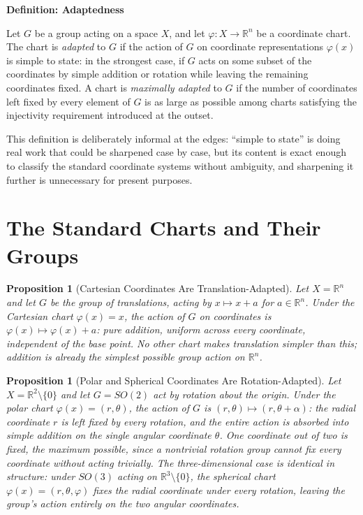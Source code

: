\documentclass[11pt,fleqn]{book}
\numberwithin{equation}{chapter}
\newenvironment{definition}[1]
  {\begin{definitionEnv}
   \noindent\textbf{Definition: #1}\par\smallskip}
  {\end{definitionEnv}}
\theoremstyle{plain}
\newtheorem{proposition}[theorem]{Proposition}
\theoremstyle{definition}
\theoremstyle{remark}
\newcommand{\R}{\mathbb{R}}
\providecommand{\enquote}[1]{``#1''}
\begin{document}
\begin{definition}{Adaptedness}
Let \(G\) be a group acting on a space \(X\), and let \(\varphi:X\to\R^n\) be a coordinate chart. The chart is \emph{adapted} to \(G\) if the action of \(G\) on coordinate representations \(\varphi(x)\) is simple to state: in the strongest case, if \(G\) acts on some subset of the coordinates by simple addition or rotation while leaving the remaining coordinates fixed. A chart is \emph{maximally adapted} to \(G\) if the number of coordinates left fixed by every element of \(G\) is as large as possible among charts satisfying the injectivity requirement introduced at the outset.
\end{definition}

This definition is deliberately informal at the edges: \enquote{simple to state} is doing real work that could be sharpened case by case, but its content is exact enough to classify the standard coordinate systems without ambiguity, and sharpening it further is unnecessary for present purposes.

\section{The Standard Charts and Their Groups}

\begin{proposition}[Cartesian Coordinates Are Translation-Adapted]
Let \(X=\R^n\) and let \(G\) be the group of translations, acting by \(x\mapsto x+a\) for \(a\in\R^n\). Under the Cartesian chart \(\varphi(x)=x\), the action of \(G\) on coordinates is \(\varphi(x)\mapsto \varphi(x)+a\): pure addition, uniform across every coordinate, independent of the base point. No other chart makes translation simpler than this; addition is already the simplest possible group action on \(\R^n\).
\end{proposition}

\begin{proposition}[Polar and Spherical Coordinates Are Rotation-Adapted]
Let \(X=\R^2\setminus\{0\}\) and let \(G=SO(2)\) act by rotation about the origin. Under the polar chart \(\varphi(x)=(r,\theta)\), the action of \(G\) is \((r,\theta)\mapsto(r,\theta+\alpha)\): the radial coordinate \(r\) is left fixed by every rotation, and the entire action is absorbed into simple addition on the single angular coordinate \(\theta\). One coordinate out of two is fixed, the maximum possible, since a nontrivial rotation group cannot fix every coordinate without acting trivially. The three-dimensional case is identical in structure: under \(SO(3)\) acting on \(\R^3\setminus\{0\}\), the spherical chart \(\varphi(x)=(r,\theta,\varphi)\) fixes the radial coordinate under every rotation, leaving the group's action entirely on the two angular coordinates.
\end{proposition}
\end{document}
